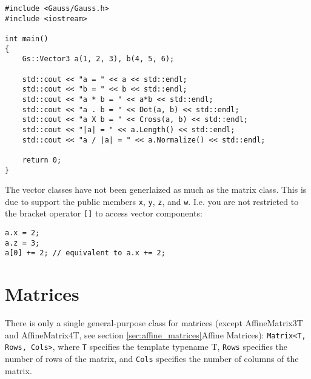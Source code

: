 \documentclass{article}
\begin{document}
\begin{lstlisting}
#include <Gauss/Gauss.h>
#include <iostream>

int main()
{
	Gs::Vector3 a(1, 2, 3), b(4, 5, 6);
	
	std::cout << "a = " << a << std::endl;
	std::cout << "b = " << b << std::endl;
	std::cout << "a * b = " << a*b << std::endl;
	std::cout << "a . b = " << Dot(a, b) << std::endl;
	std::cout << "a X b = " << Cross(a, b) << std::endl;
	std::cout << "|a| = " << a.Length() << std::endl;
	std::cout << "a / |a| = " << a.Normalize() << std::endl;
	
	return 0;
}
\end{lstlisting}
The vector classes have not been generlaized as much as the matrix class. This is due to support the public members
\texttt{x}, \texttt{y}, \texttt{z}, and \texttt{w}. I.e. you are not restricted to the bracket operator \texttt{[]}
to access vector components:
\begin{lstlisting}
a.x = 2;
a.z = 3;
a[0] += 2; // equivalent to a.x += 2;
\end{lstlisting}



\section*{Matrices}

There is only a single general-purpose class for matrices
(except AffineMatrix3T and AffineMatrix4T, see section \ref{sec:affine_matrices}{Affine Matrices}):
\texttt{Matrix<T, Rows, Cols>}, where \texttt{T} specifies the template typename T, \texttt{Rows} specifies the
number of rows of the matrix, and \texttt{Cols} specifies the number of columns of the matrix.
\end{document}
